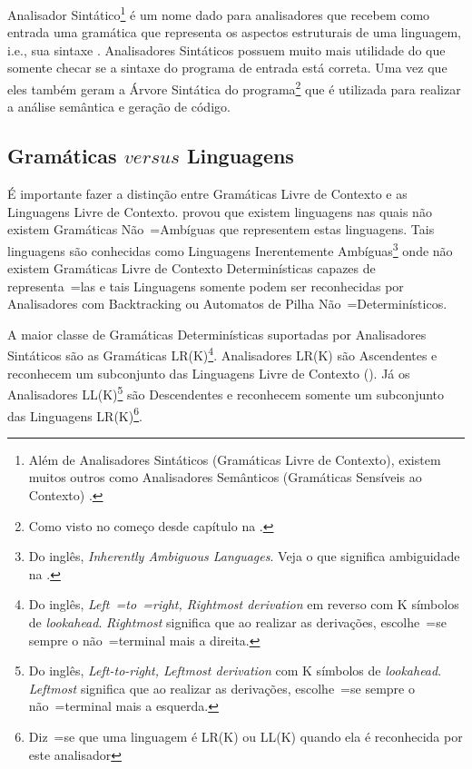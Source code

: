Analisador Sintático\footnote{
Além de Analisadores Sintáticos (Gramáticas Livre de Contexto),
existem muitos outros como Analisadores Semânticos (Gramáticas Sensíveis ao Contexto) \cite{contextSensitiveParsing}.
}
é um nome dado para analisadores que recebem como entrada uma gramática que representa os aspectos estruturais de uma linguagem,
i.e.,
sua sintaxe \cite{ahoCompilerDragonBook}.
Analisadores Sintáticos possuem muito mais utilidade do que somente checar se a sintaxe do programa de entrada está correta.
Uma vez que eles também geram a Árvore Sintática do programa\footnote{
Como visto no começo desde capítulo na .
}
que é utilizada para realizar a análise semântica e
geração de código.


\subsection{Gramáticas $versus$ Linguagens}
\label{gramaticasVersusLinguagens}

É importante fazer a distinção entre Gramáticas Livre de Contexto e
as Linguagens Livre de Contexto.
 provou que existem linguagens nas quais não existem Gramáticas Não~=Ambíguas que representem estas linguagens.
Tais linguagens são conhecidas como Linguagens Inerentemente Ambíguas\footnote{
Do inglês,
\textit{Inherently Ambiguous Languages}.
Veja o que significa ambiguidade na .
}
onde não existem Gramáticas Livre de Contexto Determinísticas capazes de representa~=las e
tais Linguagens somente podem ser reconhecidas por Analisadores com Backtracking \cite{ahoCompilerDragonBook} ou
Automatos de Pilha Não~=Determinísticos.

A maior classe de Gramáticas Determinísticas suportadas por Analisadores Sintáticos são as Gramáticas LR(K)\footnote{
Do inglês, \textit{Left~=to~=right,
Rightmost derivation} em reverso com K símbolos de \textit{lookahead}.
\textit{Rightmost} significa que ao realizar as derivações,
escolhe~=se sempre o não~=terminal mais a direita.
}.
Analisadores LR(K) \cite{ahoCompilerDragonBook} são Ascendentes e
reconhecem um subconjunto das Linguagens Livre de Contexto ().
Já os Analisadores LL(K)\footnote{
Do inglês, \textit{Left-to-right,
Leftmost derivation} com K símbolos de \textit{lookahead}.
\textit{Leftmost} significa que ao realizar as derivações,
escolhe~=se sempre o não~=terminal mais a esquerda.
}
são Descendentes \cite{antlrBookTerrentParr,llStarAntlr,allStarAntlr} e
reconhecem somente um subconjunto das Linguagens LR(K)\footnote{
Diz~=se que uma linguagem é LR(K) ou
LL(K) quando ela é reconhecida por este analisador
}.

